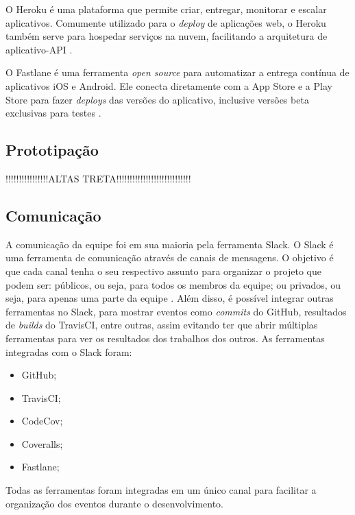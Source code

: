 O Heroku é uma plataforma que permite criar, entregar, monitorar e escalar aplicativos. Comumente utilizado para o \textit{deploy} de aplicações web, o Heroku também serve para hospedar serviços na nuvem, facilitando a arquitetura de aplicativo-API \cite{heroku}.

O Fastlane é uma ferramenta \textit{open source} para automatizar a entrega contínua de aplicativos iOS e Android. Ele conecta diretamente com a App Store e a Play Store para fazer \textit{deploys} das versões do aplicativo, inclusive versões beta exclusivas para testes \cite{fastlane}.

\subsection{Prototipação}

!!!!!!!!!!!!!!!!ALTAS TRETA!!!!!!!!!!!!!!!!!!!!!!!!!!!!

\subsection{Comunicação}

A comunicação da equipe foi em sua maioria pela ferramenta Slack. O Slack é uma ferramenta de comunicação através de canais de mensagens. O objetivo é que cada canal tenha o seu respectivo assunto para organizar o projeto que podem ser: públicos, ou seja, para todos os membros da equipe; ou privados, ou seja, para apenas uma parte da equipe \cite{slack}. Além disso, é possível integrar outras ferramentas no Slack, para mostrar eventos como \textit{commits} do GitHub, resultados de \textit{builds} do TravisCI, entre outras, assim evitando ter que abrir múltiplas ferramentas para ver os resultados dos trabalhos dos outros. As ferramentas integradas com o Slack foram:

\begin{itemize}
    \item GitHub;
    \item TravisCI;
    \item CodeCov;
    \item Coveralls;
    \item Fastlane;
\end{itemize}

Todas as ferramentas foram integradas em um único canal para facilitar a organização dos eventos durante o desenvolvimento.
